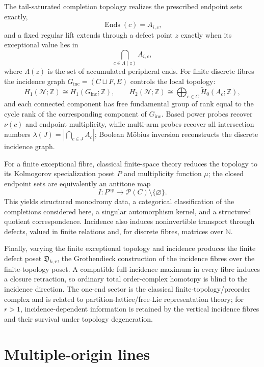 \documentclass[11pt]{article}
\theoremstyle{plain}
\theoremstyle{definition}
\begin{document}
The tail-saturated completion topology realizes the prescribed endpoint sets exactly,
\[
\operatorname{Ends}(c)=A_{i,c},
\]
and a fixed regular lift extends through a defect point $z$ exactly when its
exceptional value lies in
\[
\bigcap_{c\in\Lambda(z)}A_{i,c},
\]
where $\Lambda(z)$ is the set of accumulated peripheral ends.  For finite
discrete fibres the incidence graph $G_{\mathrm{inc}}=(C\sqcup F,E)$ controls
the local topology:
\[
H_1(\mathcal N;\mathbb Z)\cong H_1(G_{\mathrm{inc}};\mathbb Z),
\qquad
H_2(\mathcal N;\mathbb Z)\cong
\bigoplus_{c\in C}\widetilde H_0(A_c;\mathbb Z),
\]
and each connected component has free fundamental group of rank equal to the
cycle rank of the corresponding component of $G_{\mathrm{inc}}$.  Based power
probes recover $\nu(c)$ and endpoint multiplicity, while multi-arm probes
recover all intersection numbers
$\lambda(J)=|\bigcap_{c\in J}A_c|$; Boolean M\"obius inversion reconstructs
the discrete incidence graph.

For a finite exceptional fibre, classical finite-space theory
\citep{Alexandroff1937,Stong1966,McCord1966,Barmak2011} reduces the topology to
its Kolmogorov specialization poset $P$ and multiplicity function $\mu$; the
closed endpoint sets are equivalently an antitone map
\[
I:P^{\mathrm{op}}\longrightarrow\mathcal P(C)\setminus\{\varnothing\}.
\]
This yields structured monodromy data, a categorical classification of the
completions considered here, a singular automorphism kernel, and a structured
quotient correspondence.  Incidence also induces noninvertible transport
through defects, valued in finite relations and, for discrete fibres, matrices
over $\mathbb N$.

Finally, varying the finite exceptional topology and incidence produces the finite
defect poset $\mathfrak D_{k,r}$, the Grothendieck construction of the incidence fibres
over the finite-topology poset.  A compatible full-incidence maximum in every fibre
induces a closure retraction, so ordinary total order-complex homotopy is blind to the
incidence direction.  The one-end sector is the classical finite-topology/preorder
complex and is related to partition-lattice/free-Lie representation theory; for $r>1$,
incidence-dependent information is retained by the vertical incidence fibres and their
survival under topology degeneration.




\section{Multiple-origin lines}
\label{sec:multiple-origin}
\end{document}
